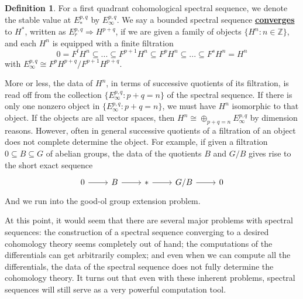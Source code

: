 \documentclass{article}
\theoremstyle{definition}
\theoremstyle{definition}
\theoremstyle{definition}
\theoremstyle{definition}
\theoremstyle{definition}
\newtheorem{definition}{Definition}[section]
\theoremstyle{definition}
\theoremstyle{definition}
\begin{document}
\begin{tcolorbox}[colback=purple!5!white,colframe=purple!75!black]
\begin{definition}
For a first quadrant cohomological spectral sequence, we denote the stable value at $E_*^{p,q}$ by $E_{\infty}^{p,q}$. We say a bounded spectral sequence \underline{\textbf{converges}} to $H^*$, written as $E_r^{p,q}\Longrightarrow H^{p+q}$, if we are given a family of objects $\{H^n: n\in \mathbb{Z}\}$, and each $H^n$ is equipped with a finite filtration
\[
0=F^tH^n\subseteq ...\subseteq F^{p+1}H^n\subseteq F^pH^n\subseteq ...\subseteq F^sH^n=H^n
\] 
with $E^{p,q}_{\infty}\cong F^pH^{p+q}/F^{p+1}H^{p+q}$. 
\end{definition}
\end{tcolorbox}
More or less, the data of $H^n$, in terms of successive quotients of its filtration, is read off from the collection $\{E_{\infty}^{p,q}: p+q=n\}$ of the spectral sequence. If there is only one nonzero object in $\{E_{\infty}^{p,q}: p+q=n\}$, we must have $H^n$ isomorphic to that object. If the objects are all vector spaces, then $H^n\cong \oplus_{p+q=n} E_{\infty}^{p,q}$ by dimension reasons. However, often in general successive quotients of a filtration of an object does not complete determine the object. For example, if given a filtration $0\subseteq B\subseteq G$
of abelian groups, the data of the quotients $B$ and $G/B$ gives rise to the short exact sequence 
\[\begin{tikzcd}
0\arrow[r]&B\arrow[r]&*\arrow[r]&G/B\arrow[r]&0
\end{tikzcd}\]
And we run into the good-ol group extension problem. 

At this point, it would seem that there are several major problems with spectral sequences: the construction of a spectral sequence converging to a desired cohomology theory seems completely out of hand; the computations of the differentials can get arbitrarily complex; and even when we can compute all the differentials, the data of the spectral sequence does not fully determine the cohomology theory. It turns out that even with these inherent problems, spectral sequences will still serve as a very powerful computation tool.
\end{document}
